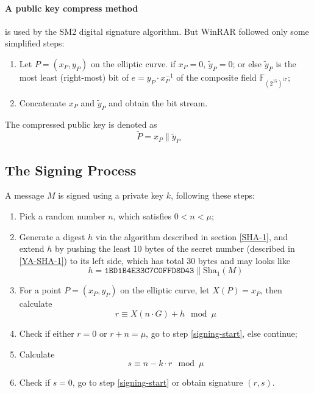 \documentclass[oneside]{article}
\begin{document}
\paragraph{A public key compress method} is used by the SM2 digital signature algorithm.
But WinRAR followed only some simplified steps:
\begin{enumerate}
      \item Let $P=\left(x_P,y_P\right)$ on the elliptic curve. if $x_P=0$, $\tilde{y}_P=0$; or else $\tilde{y}_P$ is the most least (right-most) bit of $e=y_P\cdot x_P^{-1}$ of the composite field $\mathbb{F}_{\left(2^{15}\right)^{17}}$;
      \item Concatenate $x_P$ and $\tilde{y}_P$ and obtain the bit stream.
\end{enumerate}

The compressed public key is denoted as
\[\tilde{P}=x_P\parallel\tilde{y}_P\]

\subsection{The Signing Process}\label{sign}
A message $M$ is signed using a private key $k$, following these steps:
\begin{enumerate}
      \item Pick a random number $n$, which satisfies $0<n<\mu$;\label{signing-start}
      \item Generate a digest $h$ via the algorithm described in section \ref{SHA-1}, and extend $h$ by pushing the least 10 bytes of the secret number (described in \ref{YA-SHA-1}) to its left side, which has total 30 bytes and may looks like
            \[h=\mathtt{1BD1B4E33C7C0FFD8D43}\parallel\mathrm{Sha}_1\left(M\right)\]
      \item For a point $P=\left(x_P,y_P\right)$ on the elliptic curve, let $X\left(P\right)=x_P$, then calculate
            \[r\equiv X\left(n\cdot G\right)+h\mod{\mu}\]
      \item Check if either $r=0$ or $r+n=\mu$, go to step \ref{signing-start}, else continue;
      \item Calculate
            \[s\equiv n-k\cdot r\mod{\mu}\]
      \item Check if $s=0$, go to step \ref{signing-start} or obtain signature $\left(r,s\right)$.
\end{enumerate}
\end{document}
